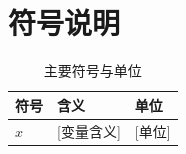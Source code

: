 \section{符号说明}
\begin{table}[H]\centering
\caption{主要符号与单位}\label{tab:symbols}
\begin{tabular}{lll}\toprule
符号 & 含义 & 单位\\\midrule
$x$ & [变量含义] & [单位]\\\bottomrule
\end{tabular}
\end{table}
